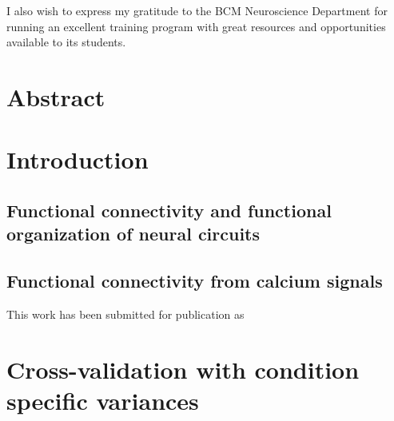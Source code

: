 \documentclass[12pt,letterpaper,titlepage,twoside,openright]{report}
\begin{document}
I also wish to express my gratitude to the BCM Neuroscience Department for running an excellent training program with great resources and opportunities available to its students.


\chapter*{Abstract}


\tableofcontents

\listoffigures


\chapter{Introduction}

\section{Functional connectivity and functional organization of neural circuits}

\section{Functional connectivity from calcium signals}
This work has been submitted for publication as \citep{Yatsenko:2014}

\appendix

\chapter{Cross-validation with condition specific variances}


\end{document}
